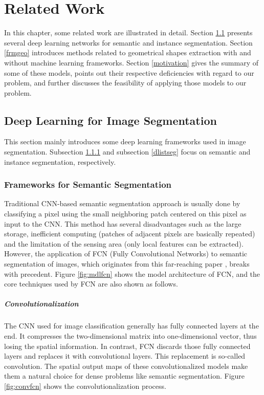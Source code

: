 \chapter{Related Work}\label{rltwrk}
In this chapter, some related work are illustrated in detail. Section \ref{dlimgseg} presents several deep learning networks for semantic and instance segmentation. Section \ref{frmgeo} introduces methods related to geometrical shapes extraction with and without machine learning frameworks. Section \ref{motivation} gives the summary of some of these models, points out their respective deficiencies with regard to our problem, and further discusses the feasibility of applying those models to our problem.

\section{Deep Learning for Image Segmentation}\label{dlimgseg}
This section mainly introduces some deep learning frameworks used in image segmentation. Subsection \ref{dlsemseg} and subsection \ref{dlistseg} focus on semantic and instance segmentation, respectively.

\subsection{Frameworks for Semantic Segmentation}\label{dlsemseg}
Traditional CNN-based semantic segmentation approach is usually done by classifying a pixel using the small neighboring patch centered on this pixel as input to the CNN. This method has several disadvantages such as the large storage, inefficient computing (patches of adjacent pixels are basically repeated) and the limitation of the sensing area (only local features can be extracted). However, the application of FCN (Fully Convolutional Networks) to semantic segmentation of images, which originates from this far-reaching paper \cite{fcn}, breaks with precedent. Figure \ref{fig:mdlfcn} shows the model architecture of FCN, and the core techniques used by FCN are also shown as follows.



\paragraph{Convolutionalization}
The CNN used for image classification generally has fully connected layers at the end. It compresses the two-dimensional matrix into one-dimensional vector, thus losing the spatial information. In contrast, FCN discards those fully connected layers and replaces it with convolutional layers. This replacement is so-called convolution. The spatial output maps of these convolutionalized models make them a natural choice for dense problems like semantic segmentation. Figure \ref{fig:convfcn} shows the convolutionalization process.

